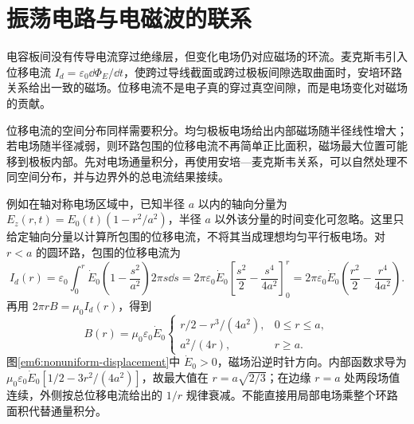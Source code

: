 \section{振荡电路与电磁波的联系}

电容板间没有传导电流穿过绝缘层，但变化电场仍对应磁场的环流。麦克斯韦引入位移电流 $I_d=\varepsilon_0\dd\Phi_E/\dd t$，使跨过导线截面或跨过极板间隙选取曲面时，安培环路关系给出一致的磁场。位移电流不是电子真的穿过真空间隙，而是电场变化对磁场的贡献。



位移电流的空间分布同样需要积分。均匀极板电场给出内部磁场随半径线性增大；若电场随半径减弱，则环路包围的位移电流不再简单正比面积，磁场最大位置可能移到极板内部。先对电场通量积分，再使用安培—麦克斯韦关系，可以自然处理不同空间分布，并与边界外的总电流结果接续。




例如在轴对称电场区域中，已知半径 $a$ 以内的轴向分量为 $E_z(r,t)=E_0(t)(1-r^2/a^2)$，半径 $a$ 以外该分量的时间变化可忽略。这里只给定轴向分量以计算所包围的位移电流，不将其当成理想均匀平行板电场。对 $r<a$ 的圆环路，包围的位移电流为
\[I_d(r)=\varepsilon_0\int_0^r\dot E_0\left(1-\frac{s^2}{a^2}\right)2\pi s\dd s
=2\pi\varepsilon_0\dot E_0
\left[\frac{s^2}{2}-\frac{s^4}{4a^2}\right]_0^r
=2\pi\varepsilon_0\dot E_0\left(\frac{r^2}{2}-\frac{r^4}{4a^2}\right).\]
再用 $2\pi rB=\mu_0I_d(r)$，得到
\[B(r)=\mu_0\varepsilon_0\dot E_0
\begin{cases}r/2-r^3/(4a^2),&0\le r\le a,\\a^2/(4r),&r\ge a.\end{cases}\]
图\ref{em6:nonuniform-displacement}中 $\dot E_0>0$，磁场沿逆时针方向。内部函数求导为 $\mu_0\varepsilon_0\dot E_0[1/2-3r^2/(4a^2)]$，故最大值在 $r=a\sqrt{2/3}$；在边缘 $r=a$ 处两段场值连续，外侧按总位移电流给出的 $1/r$ 规律衰减。不能直接用局部电场乘整个环路面积代替通量积分。


